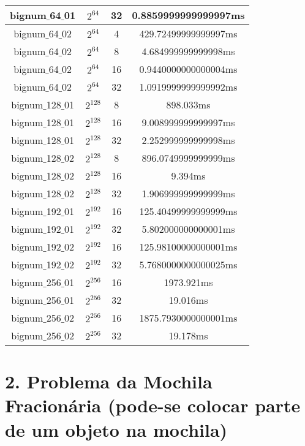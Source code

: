 \documentclass[10pt,a4paper]{article}
\begin{document}
\begin{center}
\begin{tabular}{|c|c|c|c|}
			\hline
			bignum$\_$64$\_$01 & $2^{64}$ & 32 & 0.8859999999999997ms \\
			\hline
			bignum$\_$64$\_$02 & $2^{64}$ & 4 & 429.72499999999997ms \\
			\hline
			bignum$\_$64$\_$02 & $2^{64}$ & 8 & 4.684999999999998ms \\
			\hline
			bignum$\_$64$\_$02 & $2^{64}$ & 16 & 0.9440000000000004ms \\
			\hline
			bignum$\_$64$\_$02 & $2^{64}$ & 32 & 1.0919999999999992ms \\
			\hline
			bignum$\_$128$\_$01 & $2^{128}$ & 8 & 898.033ms\\
			\hline
			bignum$\_$128$\_$01 & $2^{128}$ & 16 & 9.008999999999997ms\\
			\hline
			bignum$\_$128$\_$01 & $2^{128}$ & 32 & 2.252999999999998ms\\
			\hline
			bignum$\_$128$\_$02 & $2^{128}$ & 8 & 896.0749999999999ms\\
			\hline
			bignum$\_$128$\_$02 & $2^{128}$ & 16 & 9.394ms\\
			\hline
			bignum$\_$128$\_$02 & $2^{128}$ & 32 & 1.906999999999999ms\\
			\hline
			bignum$\_$192$\_$01 & $2^{192}$ & 16 & 125.40499999999999ms\\
			\hline
			bignum$\_$192$\_$01 & $2^{192}$ & 32 & 5.802000000000001ms\\
			\hline
			bignum$\_$192$\_$02 & $2^{192}$ & 16 & 125.98100000000001ms\\
			\hline
			bignum$\_$192$\_$02 & $2^{192}$ & 32 & 5.7680000000000025ms\\
			\hline
			bignum$\_$256$\_$01 & $2^{256}$ & 16 & 1973.921ms\\
			\hline
			bignum$\_$256$\_$01 & $2^{256}$ & 32 & 19.016ms\\
			\hline
			bignum$\_$256$\_$02 & $2^{256}$ & 16 & 1875.7930000000001ms\\
			\hline
			bignum$\_$256$\_$02 & $2^{256}$ & 32 & 19.178ms\\
			\hline
			
		\end{tabular}
	\end{center}
	
	
	
	\section*{2. Problema da Mochila Fracionária (pode-se colocar parte de um objeto na mochila)}
	
\end{document}
